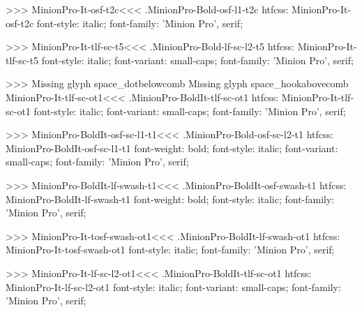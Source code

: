 {>>>
\<MinionPro-It-osf-t2c\><<<
.MinionPro-Bold-osf-l1-t2c
htfcss:  MinionPro-It-osf-t2c  font-style: italic; font-family: 'Minion Pro', serif;

>>>
\<MinionPro-It-tlf-sc-t5\><<<
.MinionPro-Bold-lf-sc-l2-t5
htfcss:  MinionPro-It-tlf-sc-t5  font-style: italic; font-variant: small-caps; font-family: 'Minion Pro', serif;

>>>
Missing glyph	space_dotbelowcomb
Missing glyph	space_hookabovecomb
\<MinionPro-It-tlf-sc-ot1\><<<
.MinionPro-BoldIt-tlf-sc-ot1
htfcss:  MinionPro-It-tlf-sc-ot1  font-style: italic; font-variant: small-caps; font-family: 'Minion Pro', serif;

>>>
\<MinionPro-BoldIt-osf-sc-l1-t1\><<<
.MinionPro-Bold-osf-sc-l2-t1
htfcss:  MinionPro-BoldIt-osf-sc-l1-t1  font-weight: bold; font-style: italic; font-variant: small-caps; font-family: 'Minion Pro', serif;

>>>
\<MinionPro-BoldIt-lf-swash-t1\><<<
.MinionPro-BoldIt-osf-swash-t1
htfcss:  MinionPro-BoldIt-lf-swash-t1  font-weight: bold; font-style: italic; font-family: 'Minion Pro', serif;

>>>
\<MinionPro-It-tosf-swash-ot1\><<<
.MinionPro-BoldIt-lf-swash-ot1
htfcss:  MinionPro-It-tosf-swash-ot1  font-style: italic; font-family: 'Minion Pro', serif;

>>>
\<MinionPro-It-lf-sc-l2-ot1\><<<
.MinionPro-BoldIt-tlf-sc-ot1
htfcss:  MinionPro-It-lf-sc-l2-ot1  font-style: italic; font-variant: small-caps; font-family: 'Minion Pro', serif;

}
